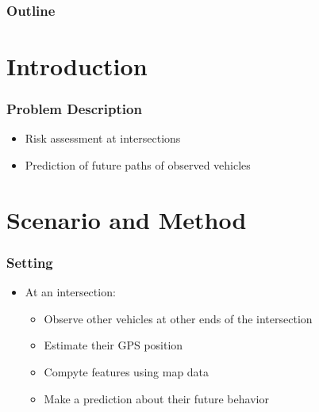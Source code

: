 \documentclass{beamer}
\title{}
\author{Salman A. Khokhar}
\institute{%
Honda Research Institute\\
}
\date{\today}
\begin{document}
\begin{frame}
\titlepage
\end{frame}

\begin{frame}
\frametitle{Outline}
\tableofcontents
\end{frame}


\section{Introduction}

\begin{frame}
\frametitle{Problem Description}

\begin{itemize}
  \item Risk assessment at intersections
  \item Prediction of future paths of observed vehicles
\end{itemize}
\end{frame}

\section{Scenario and Method}

\begin{frame}
\frametitle{Setting}

\begin{itemize}
  \item At an intersection:
  \begin{itemize}
    \item Observe other vehicles at other ends of the intersection
    \item Estimate their GPS position
    \item Compyte features using map data
    \item Make a prediction about their future behavior
  \end{itemize}
\end{itemize}
\end{frame}
\end{document}
